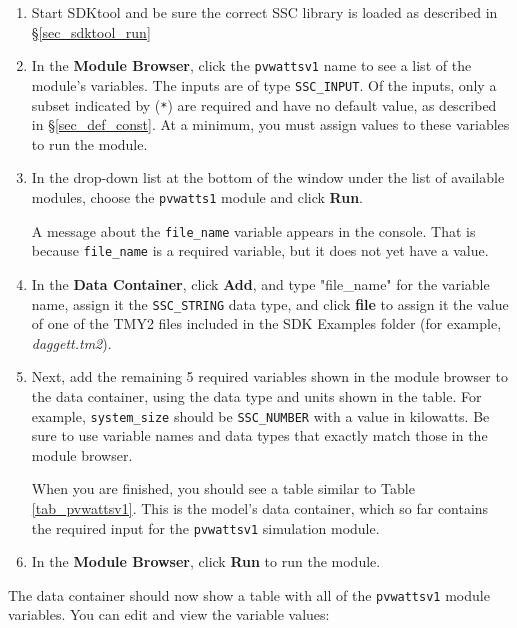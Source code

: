 \documentclass{scrartcl} %
\begin{document}
\begin{enumerate}
\item Start SDKtool and be sure the correct SSC library is loaded as described in \S\ref{sec_sdktool_run}

\item In the \textbf{Module Browser}, click the \texttt{pvwattsv1} name to see a list of the module's variables. The inputs are of type \texttt{SSC\_INPUT}. Of the inputs, only a subset indicated by (\texttt{*}) are required and have no default value, as described in \S\ref{sec_def_const}. At a minimum, you must assign values to these variables to run the module.

\item In the drop-down list at the bottom of the window under the list of available modules, choose the \texttt{pvwatts1} module and click \textbf{Run}.

A message about the \texttt{file\_name} variable appears in the console. That is because \texttt{file\_name} is a required variable, but it does not yet have a value.

\item In the \textbf{Data Container}, click \textbf{Add}, and type "file\_name" for the variable name, assign it the \texttt{SSC\_STRING} data type, and click \textbf{file} to assign it the value of one of the TMY2 files included in the SDK Examples folder (for example, \textit{daggett.tm2}).

\item Next, add the remaining 5 required variables shown in the module browser to the data container, using the data type and units shown in the table. For example, \texttt{system\_size} should be \texttt{SSC\_NUMBER} with a value in kilowatts. Be sure to use variable names and data types that exactly match those in the module browser.

When you are finished, you should see a table similar to Table \ref{tab_pvwattsv1}. This is the model's data container, which so far contains the required input for the \texttt{pvwattsv1} simulation module.

\item In the \textbf{Module Browser}, click \textbf{Run} to run the module. 
\end{enumerate}

The data container should now show a table with all of the \texttt{pvwattsv1} module variables. You can edit and view the variable values:
\end{document}
